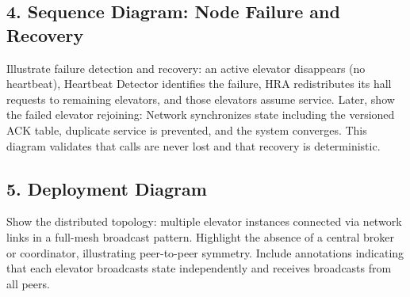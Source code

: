 \documentclass[12pt,a4paper]{article}
\begin{document}
\subsection*{4. Sequence Diagram: Node Failure and Recovery}

Illustrate failure detection and recovery: an active elevator disappears (no heartbeat), Heartbeat Detector identifies the failure, HRA redistributes its hall requests to remaining elevators, and those elevators assume service. Later, show the failed elevator rejoining: Network synchronizes state including the versioned ACK table, duplicate service is prevented, and the system converges. This diagram validates that calls are never lost and that recovery is deterministic.

\subsection*{5. Deployment Diagram}

Show the distributed topology: multiple elevator instances connected via network links in a full-mesh broadcast pattern. Highlight the absence of a central broker or coordinator, illustrating peer-to-peer symmetry. Include annotations indicating that each elevator broadcasts state independently and receives broadcasts from all peers.
\end{document}
